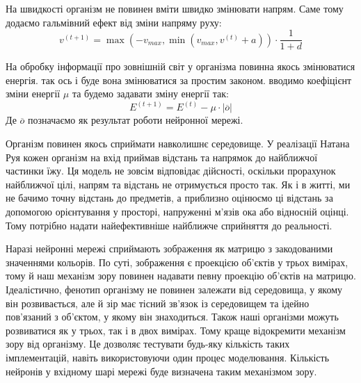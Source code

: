 На швидкості організм не повинен вміти швидко змінювати напрям. 
Саме тому додаємо гальмівний ефект від зміни напряму руху:
\[ v^{(t+1)} = \max(-v_{max}, \min(v_{max}, v^{(t)} + a)) \cdot \frac{1}{1 + d} \]


На обробку інформації про зовнішній світ у організма повинна 
якось змінюватися енергія. 
так ось і буде вона змінюватися за простим законом. 
вводимо коефіцієнт зміни енергії $\mu$ та будемо задавати зміну енергії так:
\[ E^{(t+1)} = E^{(t)} - \mu \cdot \left| \overline{o} \right| \]
Де $\overline{o}$ позначаємо як результат роботи нейронної мережі.


Організм повинен якось сприймати навколишнє середовище.
У реалізації Натана Руя \cite{rooyEvolvingSimpleOrganisms}
кожен організм на вхід приймав відстань та напрямок до найближчої
частинки їжу.
Ця модель не зовсім відповідає дійсності, оскільки
прорахунок найближчої цілі, напрям та відстань не отримується просто так.
Як і в житті, ми не бачимо точну відстань до предметів,
а приблизно оцінюємо ці відстань за допомогою орієнтування у просторі,
напруженні м'язів ока або відносній оцінці.
Тому потрібно надати найефективніше найближче сприйняття
до реальності.

Наразі нейронні мережі сприймають зображення як матрицю 
з закодованими значеннями кольорів.
По суті, зображення є проекцією об’єктів у трьох вимірах, тому й
наш механізм зору повинен надавати певну проекцію об'єктів на матрицю.
Ідеалістично, фенотип організму не повинен залежати від середовища, 
у якому він розвивається, але й зір має тісний зв’язок із 
середовищем та ідейно пов’язаний з об’єктом, у якому він знаходиться.
Також наші організми можуть розвиватися як у трьох, так і в двох вимірах.
Тому краще відокремити механізм зору від організму.
Це дозволяє тестувати будь-яку кількість таких імплементацій, 
навіть використовуючи один процес моделювання.
Кількість нейронів у вхідному шарі мережі буде визначена таким механізмом зору.

